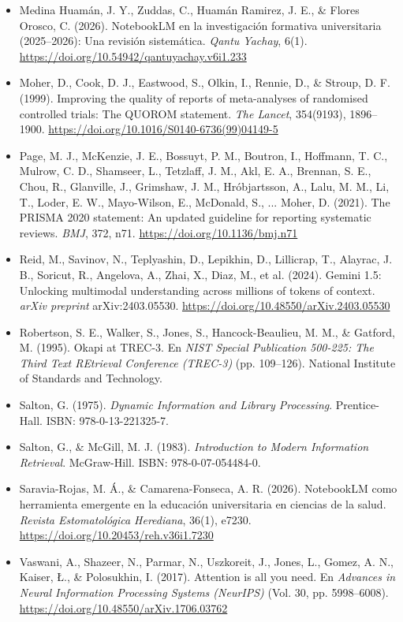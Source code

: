 \begin{itemize}[leftmargin=1.5em, label={}, itemsep=0.22ex, parsep=0pt]
    \item Medina Huamán, J. Y., Zuddas, C., Huamán Ramirez, J. E., \& Flores Orosco, C. (2026). NotebookLM en la investigación formativa universitaria (2025--2026): Una revisión sistemática. \textit{Qantu Yachay}, 6(1). \url{https://doi.org/10.54942/qantuyachay.v6i1.233}
    \item Moher, D., Cook, D. J., Eastwood, S., Olkin, I., Rennie, D., \& Stroup, D. F. (1999). Improving the quality of reports of meta-analyses of randomised controlled trials: The QUOROM statement. \textit{The Lancet}, 354(9193), 1896--1900. \url{https://doi.org/10.1016/S0140-6736(99)04149-5}
    \item Page, M. J., McKenzie, J. E., Bossuyt, P. M., Boutron, I., Hoffmann, T. C., Mulrow, C. D., Shamseer, L., Tetzlaff, J. M., Akl, E. A., Brennan, S. E., Chou, R., Glanville, J., Grimshaw, J. M., Hróbjartsson, A., Lalu, M. M., Li, T., Loder, E. W., Mayo-Wilson, E., McDonald, S., ... Moher, D. (2021). The PRISMA 2020 statement: An updated guideline for reporting systematic reviews. \textit{BMJ}, 372, n71. \url{https://doi.org/10.1136/bmj.n71}
    \item Reid, M., Savinov, N., Teplyashin, D., Lepikhin, D., Lillicrap, T., Alayrac, J. B., Soricut, R., Angelova, A., Zhai, X., Diaz, M., et al. (2024). Gemini 1.5: Unlocking multimodal understanding across millions of tokens of context. \textit{arXiv preprint} arXiv:2403.05530. \url{https://doi.org/10.48550/arXiv.2403.05530}
    \item Robertson, S. E., Walker, S., Jones, S., Hancock-Beaulieu, M. M., \& Gatford, M. (1995). Okapi at TREC-3. En \textit{NIST Special Publication 500-225: The Third Text REtrieval Conference (TREC-3)} (pp. 109--126). National Institute of Standards and Technology.
    \item Salton, G. (1975). \textit{Dynamic Information and Library Processing}. Prentice-Hall. ISBN: 978-0-13-221325-7.
    \item Salton, G., \& McGill, M. J. (1983). \textit{Introduction to Modern Information Retrieval}. McGraw-Hill. ISBN: 978-0-07-054484-0.
    \item Saravia-Rojas, M. Á., \& Camarena-Fonseca, A. R. (2026). NotebookLM como herramienta emergente en la educación universitaria en ciencias de la salud. \textit{Revista Estomatológica Herediana}, 36(1), e7230. \url{https://doi.org/10.20453/reh.v36i1.7230}
    \item Vaswani, A., Shazeer, N., Parmar, N., Uszkoreit, J., Jones, L., Gomez, A. N., Kaiser, \L., \& Polosukhin, I. (2017). Attention is all you need. En \textit{Advances in Neural Information Processing Systems (NeurIPS)} (Vol. 30, pp. 5998--6008). \url{https://doi.org/10.48550/arXiv.1706.03762}

\end{itemize}
